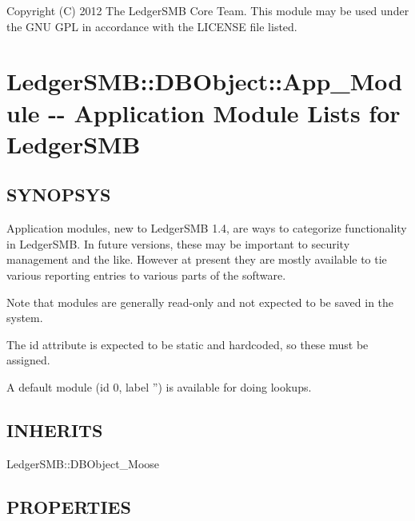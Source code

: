 \begin{description}
\begin{description}
\begin{description}
\begin{description}
\begin{description}
\begin{description}
\begin{description}
\begin{description}
\begin{description}
\begin{description}
Copyright (C) 2012 The LedgerSMB Core Team.  This module may be used under the
GNU GPL in accordance with the LICENSE file listed.

\section{LedgerSMB::DBObject::App\_Module -{}- Application Module Lists for LedgerSMB\label{LedgerSMB::DBObject::App_Module_-_-_Application_Module_Lists_for_LedgerSMB}}




\subsection*{SYNOPSYS\label{LedgerSMB::DBObject::App_Module_-_-_Application_Module_Lists_for_LedgerSMB_SYNOPSYS}}


Application modules, new to LedgerSMB 1.4, are ways to categorize functionality in 
LedgerSMB.  In future versions, these may be important to security management and the
like.  However at present they are mostly available to tie various reporting entries
to various parts of the software.



Note that modules are generally read-only and not expected to be saved in the system.



The id attribute is expected to be static and hardcoded, so these must be assigned.



A default module (id 0, label '') is available for doing lookups.

\subsection*{INHERITS\label{LedgerSMB::DBObject::App_Module_-_-_Application_Module_Lists_for_LedgerSMB_INHERITS}}
\begin{description}

\item[{LedgerSMB::DBObject\_Moose}] \mbox{}\end{description}
\subsection*{PROPERTIES\label{LedgerSMB::DBObject::App_Module_-_-_Application_Module_Lists_for_LedgerSMB_PROPERTIES}}
\begin{description}


\end{description}
\end{description}
\end{description}
\end{description}
\end{description}
\end{description}
\end{description}
\end{description}
\end{description}
\end{description}
\end{description}
